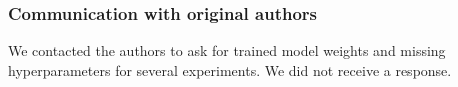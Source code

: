 \subsubsection*{Communication with original authors}
We contacted the authors to ask for trained model weights and missing hyperparameters for several experiments. We did not receive a response.
